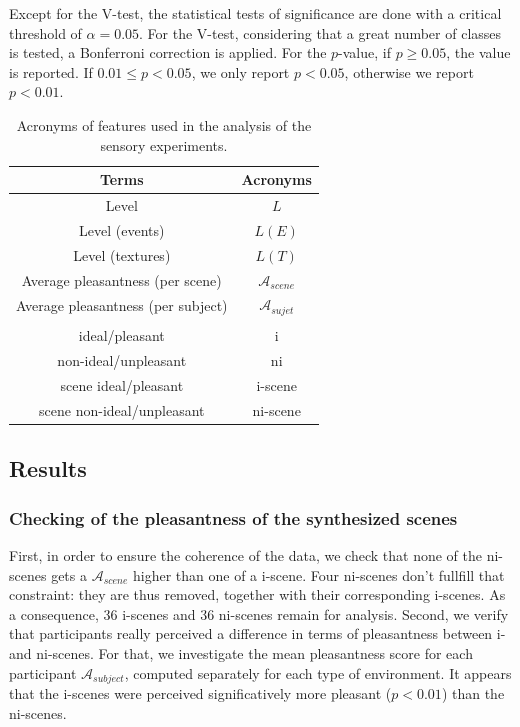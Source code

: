 \documentclass[preprint,12pt]{elsarticle}
\begin{document}
Except for the V-test, the statistical tests of significance are done with a critical threshold of $\alpha=0.05$. For the V-test, considering that a great number of classes is tested, a Bonferroni correction is applied. For the $p$-value, if $p\geq0.05$, the value is reported. If $0.01\leq p<0.05$, we only report $p<0.05$, otherwise we report $p<0.01$.

\begin{table}[t]
\centering
\begin{tabular}{c c}
Terms                         & Acronyms              \\
\hline
Level                        & $L$                    \\
Level (events)            & $L(E)$                 \\
Level (textures)              & $L(T)$                 \\
Average pleasantness (per scene)     & $\mathcal{A}_{scene}$  \\
Average pleasantness (per subject)     & $\mathcal{A}_{sujet}$  \\
                               &                        \\
ideal/pleasant                & i                      \\
non-ideal/unpleasant         & ni                     \\
scene ideal/pleasant          & i-scene                \\
scene non-ideal/unpleasant   & ni-scene               \\
\hline
\end{tabular}
\vspace{0.5mm}
\caption{Acronyms of features used in the analysis of the sensory experiments.}
\label{tab:acronyme}
\end{table}

\subsection{Results}

\subsubsection*{Checking of the pleasantness of the synthesized scenes}

First, in order to ensure the coherence of the data, we check that none of the ni-scenes gets a $\mathcal{A}_{scene}$ higher than one of a i-scene. Four ni-scenes don’t fullfill that constraint: they are thus removed, together with their corresponding i-scenes. As a consequence, 36 i-scenes and 36 ni-scenes remain for analysis. Second, we verify that participants really perceived a difference in terms of pleasantness between i- and ni-scenes. For that, we investigate the mean pleasantness score for each participant $\mathcal{A}_{subject}$, computed separately for each type of environment. It appears that the i-scenes were perceived significatively more pleasant ($p < 0.01$) than the ni-scenes.
\end{document}
